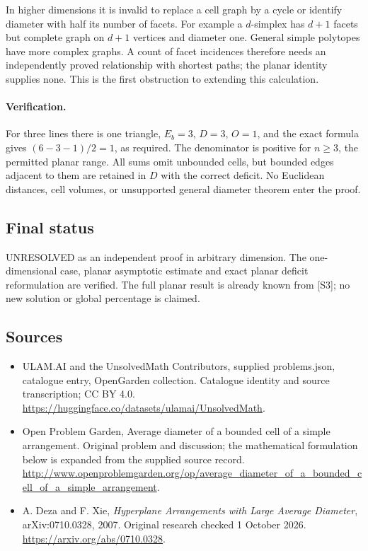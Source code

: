 \documentclass[11pt,a4paper]{article}
\begin{document}
In higher dimensions it is invalid to replace a cell graph by a
cycle or identify diameter with half its number of facets. For
example a $d$-simplex has $d+1$ facets but complete graph on $d+1$
vertices and diameter one. General simple polytopes have more complex
graphs. A count of facet incidences therefore needs an independently
proved relationship with shortest paths; the planar identity supplies
none. This is the first obstruction to extending this calculation.

\paragraph{Verification.}
For three lines there is one triangle, $E_b=3$, $D=3$, $O=1$,
and the exact formula gives $(6-3-1)/2=1$, as required.
The denominator is positive for $n\ge3$, the permitted planar range.
All sums omit unbounded cells, but bounded edges adjacent to them
are retained in $D$ with the correct deficit. No Euclidean distances,
cell volumes, or unsupported general diameter theorem enter the proof.

\subsection{Final status}
UNRESOLVED as an independent proof in arbitrary dimension. The
one-dimensional case, planar asymptotic estimate and exact planar
deficit reformulation are verified. The full planar result is already
known from [S3]; no new solution or global percentage is claimed.

\subsection{Sources}
\begin{itemize}
\item[S1] ULAM.AI and the UnsolvedMath Contributors, supplied problems.json, catalogue entry, OpenGarden collection. Catalogue identity and source transcription; CC BY 4.0.
\url{https://huggingface.co/datasets/ulamai/UnsolvedMath}.
\item[S2] Open Problem Garden, Average diameter of a bounded cell of a simple arrangement. Original problem and discussion; the mathematical formulation below is expanded from the supplied source record.
\url{http://www.openproblemgarden.org/op/average_diameter_of_a_bounded_cell_of_a_simple_arrangement}.
\item[S3] A. Deza and F. Xie, \emph{Hyperplane Arrangements with Large Average Diameter}, arXiv:0710.0328, 2007. Original research checked 1 October 2026.
\url{https://arxiv.org/abs/0710.0328}.
\end{itemize}
\end{document}
